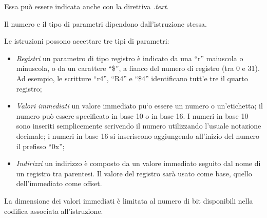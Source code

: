 \documentclass[letterpaper,10pt,english]{sphinxmanual}
\begin{document}
Essa può essere indicata anche con la direttiva \emph{.text}.

Il numero e il tipo di parametri dipendono dall'istruzione stessa.

Le istruzioni possono accettare tre tipi di parametri:
\begin{itemize}
\item {} 
\emph{Registri} un parametro di tipo registro è indicato da una
``r'' maiuscola o minuscola, o da un carattere ``\$'', a fianco del numero
di registro (tra 0 e 31). Ad esempio, le scritture ``r4'', ``R4'' e ``\$4''
identificano tutt'e tre il quarto registro;

\item {} 
\emph{Valori immediati} un valore immediato pu{}`o essere un numero o
un'etichetta; il numero può essere specificato in base 10 o in base 16. I
numeri in base 10 sono inseriti semplicemente scrivendo il numero
utilizzando l'usuale notazione decimale; i numeri in base 16 si inseriscono
aggiungendo all'inizio del numero il prefisso ``0x'';

\item {} 
\emph{Indirizzi} un indirizzo è composto da un valore immediato
seguito dal nome di un registro tra parentesi. Il valore del registro sarà
usato come base, quello dell'immediato come offset.

\end{itemize}

La dimensione dei valori immediati è limitata al numero di bit disponibili
nella codifica associata all'istruzione.
\end{document}
